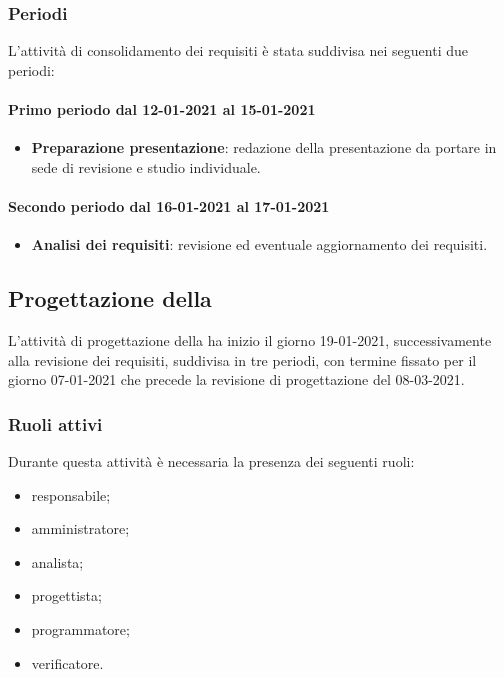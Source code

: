 \subsubsection{Periodi}
L'attività di consolidamento dei requisiti è stata suddivisa nei seguenti due periodi:

\paragraph{Primo periodo dal 12-01-2021 al 15-01-2021}
\begin{itemize}

	\item \textbf{Preparazione presentazione}: redazione della presentazione da portare in sede di revisione e studio individuale.

\end{itemize}

\paragraph{Secondo periodo dal 16-01-2021 al 17-01-2021}
\begin{itemize}

	\item \textbf{Analisi dei requisiti}: revisione ed eventuale aggiornamento dei requisiti.

\end{itemize}

\newpage


\newpage
\subsection{Progettazione della }
L'attività di progettazione della  ha inizio il giorno 19-01-2021, successivamente alla revisione dei requisiti, suddivisa in tre periodi, con termine fissato per il giorno 07-01-2021 che precede la revisione di progettazione del 08-03-2021.

\subsubsection{Ruoli attivi}
Durante questa attività è necessaria la presenza dei seguenti ruoli:
\begin{itemize}
	\item responsabile;
	\item amministratore;
	\item analista;
	\item progettista;
	\item programmatore;
	\item verificatore.
\end{itemize}

